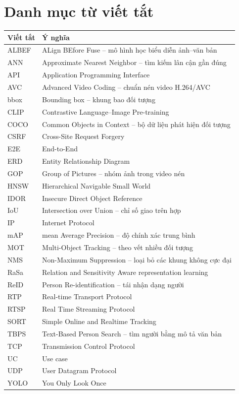 \chapter*{Danh mục từ viết tắt}

\begin{longtable}{|p{3cm}|p{11cm}|}
\hline
\textbf{Viết tắt} & \textbf{Ý nghĩa} \\
\hline
\endhead
ALBEF & ALign BEfore Fuse -- mô hình học biểu diễn ảnh--văn bản \\
\hline
ANN & Approximate Nearest Neighbor -- tìm kiếm lân cận gần đúng \\
\hline
API & Application Programming Interface \\
\hline
AVC & Advanced Video Coding -- chuẩn nén video H.264/AVC \\
\hline
bbox & Bounding box -- khung bao đối tượng \\
\hline
CLIP & Contrastive Language--Image Pre-training \\
\hline
COCO & Common Objects in Context -- bộ dữ liệu phát hiện đối tượng \\
\hline
CSRF & Cross-Site Request Forgery \\
\hline
E2E & End-to-End \\
\hline
ERD & Entity Relationship Diagram \\
\hline
GOP & Group of Pictures -- nhóm ảnh trong video nén \\
\hline
HNSW & Hierarchical Navigable Small World \\
\hline
IDOR & Insecure Direct Object Reference \\
\hline
IoU & Intersection over Union -- chỉ số giao trên hợp \\
\hline
IP & Internet Protocol \\
\hline
mAP & mean Average Precision -- độ chính xác trung bình \\
\hline
MOT & Multi-Object Tracking -- theo vết nhiều đối tượng \\
\hline
NMS & Non-Maximum Suppression -- loại bỏ các khung không cực đại \\
\hline
RaSa & Relation and Sensitivity Aware representation learning \\
\hline
ReID & Person Re-identification -- tái nhận dạng người \\
\hline
RTP & Real-time Transport Protocol \\
\hline
RTSP & Real Time Streaming Protocol \\
\hline
SORT & Simple Online and Realtime Tracking \\
\hline
TBPS & Text-Based Person Search -- tìm người bằng mô tả văn bản \\
\hline
TCP & Transmission Control Protocol \\
\hline
UC & Use case \\
\hline
UDP & User Datagram Protocol \\
\hline
YOLO & You Only Look Once \\
\hline
\end{longtable}
